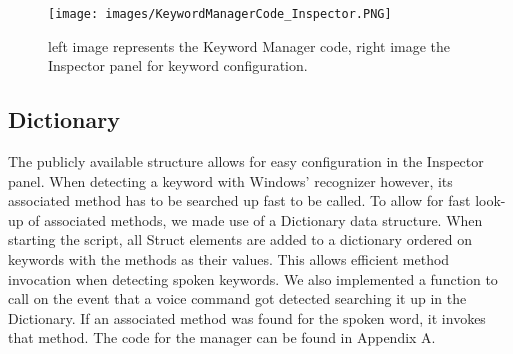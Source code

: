 \begin{figure}[!htb]
	\texttt{[image: images/KeywordManagerCode\_Inspector.PNG]}
	\captionsetup{width=1.0\textwidth}
	\centering
	\caption{left image represents the Keyword Manager code, right image the Inspector panel for keyword configuration.
	}
\end{figure}

\newpage

\subsection{Dictionary}
The publicly available structure allows for easy configuration in the Inspector panel. When detecting a keyword with Windows' recognizer however, its associated method has to be searched up fast to be called. To allow for fast look-up of associated methods, we made use of a Dictionary data structure. When starting the script, all Struct elements are added to a dictionary ordered on keywords with the methods as their values. This allows efficient method invocation when detecting spoken keywords. We also implemented a function to call on the event that a voice command got detected searching it up in the Dictionary. If an associated method was found for the spoken word, it invokes that method. The code for the manager can be found in Appendix A.







